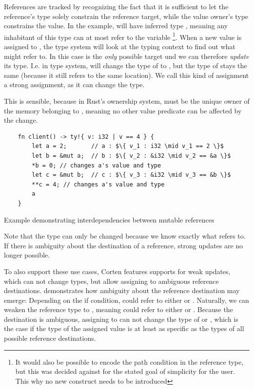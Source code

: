 \documentclass[twoside, english]{sdqthesis}
\theoremstyle{definition}
\begin{document}
References are tracked by recognizing the fact that it is sufficient to let the reference's type solely constrain the reference target, while the value owner's type constrains the value.
In the example,  will have inferred type , meaning any inhabitant of this type can at most refer to the variable \footnote{It would also be possible to encode the path condition in the reference type, but this was decided against for the stated goal of simplicity for the user. This why no new construct needs to be introduced}.
When a new value is assigned to , the type system will look at the typing context to find out what  might refer to. In this case  is the \textit{only} possible target und we can therefore \textit{update} its type. I.e. in type system,  will change the type of  to , but the type of  stays the same (because it still refers to the same location). We call this kind of assignment a strong assignment, as it can change the type.

This is sensible, because in Rust's ownership system,  must be the unique owner of the memory belonging to , meaning no other value predicate can be affected by the change.

\begin{listing}[ht]
  \begin{verbatim}
    fn client() -> ty!{ v: i32 | v == 4 } {
        let a = 2;       // a : $\{ v_1 : i32 \mid v_1 == 2 \}$
        let b = &mut a;  // b : $\{ v_2 : &i32 \mid v_2 == &a \}$
        *b = 0; // changes a's value and type
        let c = &mut b;  // c : $\{ v_3 : &i32 \mid v_3 == &b \}$
        **c = 4; // changes a's value and type
        a
    }
  \end{verbatim}
  \caption{Example demonstrating interdependencies between mutable references}
  \label{lst:mutation-strong}
\end{listing}

Note that the type can only be changed because we know exactly what  refers to. If there is ambiguity about the destination of a reference, strong updates are no longer possible.

To also support these use cases, Corten features supports for weak updates, which can not change types, but allow assigning to ambiguous reference destinations.
 demonstrates how ambiguity about the reference destination may emerge: Depending on the if condition,  could refer to either  or .
Naturally, we can weaken the reference type to , meaning  could refer to either  or .
Because the destination is ambiguous, assigning to  can not change the type of  or , which is the case if the type of the assigned value is at least as specific as the types of all possible reference destinations.
\end{document}
